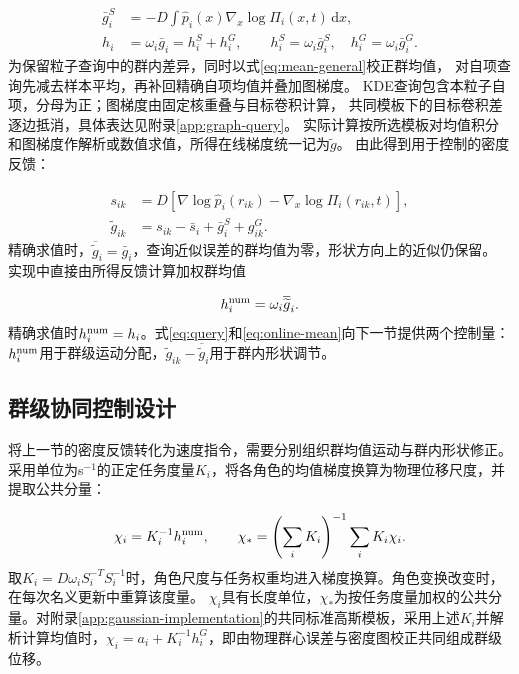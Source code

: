 \documentclass[UTF8,a4paper,11pt,fontset=none]{ctexart}
\begin{document}
\begin{equation}
\begin{aligned}
\bar g_i^S&=-D\int\widehat p_i(x)\nabla_x\log\Pi_i(x,t)\,\mathrm dx,\\
h_i&=\omega_i\bar g_i=h_i^S+h_i^G,\qquad
h_i^S=\omega_i\bar g_i^S,\quad h_i^G=\omega_i\bar g_i^G.
\end{aligned}
\label{eq:mean-general}
\end{equation}
为保留粒子查询中的群内差异，同时以式\eqref{eq:mean-general}校正群均值，
对自项查询先减去样本平均，再补回精确自项均值并叠加图梯度。
KDE查询包含本粒子自项，分母为正；图梯度由固定核重叠与目标卷积计算，
共同模板下的目标卷积差逐边抵消，具体表达见附录\ref{app:graph-query}。
实际计算按所选模板对均值积分和图梯度作解析或数值求值，所得在线梯度统一记为$\widetilde g$。
由此得到用于控制的密度反馈：

\begin{equation}
\begin{aligned}
s_{ik}&=D[\nabla\log\widehat p_i(r_{ik})-\nabla_x\log\Pi_i(r_{ik},t)],\\
\widetilde g_{ik}&=s_{ik}-\bar s_i+\bar g_i^S+g^G_{ik}.
\end{aligned}
\label{eq:query}
\end{equation}
精确求值时，$\overline{\widetilde g}_i=\bar g_i$，查询近似误差的群均值为零，形状方向上的近似仍保留。
实现中直接由所得反馈计算加权群均值

\begin{equation}
h_i^{\rm num}=\omega_i\overline{\widetilde g}_i .
\label{eq:online-mean}
\end{equation}
精确求值时$h_i^{\rm num}=h_i$。式\eqref{eq:query}和\eqref{eq:online-mean}向下一节提供两个控制量：
$h_i^{\rm num}$用于群级运动分配，$\widetilde g_{ik}-\overline{\widetilde g}_i$用于群内形状调节。

\subsection{群级协同控制设计}\label{sec:velocity-law}
将上一节的密度反馈转化为速度指令，需要分别组织群均值运动与群内形状修正。
采用单位为s$^{-1}$的正定任务度量$K_i$，将各角色的均值梯度换算为物理位移尺度，并提取公共分量：

\begin{equation}
\chi_i=K_i^{-1}h_i^{\rm num},\qquad
\chi_*=\left(\sum_iK_i\right)^{-1}\sum_iK_i\chi_i .
\label{eq:displacement}
\end{equation}
取$K_i=D\omega_iS_i^{-T}S_i^{-1}$时，角色尺度与任务权重均进入梯度换算。角色变换改变时，在每次名义更新中重算该度量。
$\chi_i$具有长度单位，$\chi_*$为按任务度量加权的公共分量。对附录\ref{app:gaussian-implementation}的共同标准高斯模板，采用上述$K_i$并解析计算均值时，$\chi_i=a_i+K_i^{-1}h_i^G$，即由物理群心误差与密度图校正共同组成群级位移。
\end{document}
